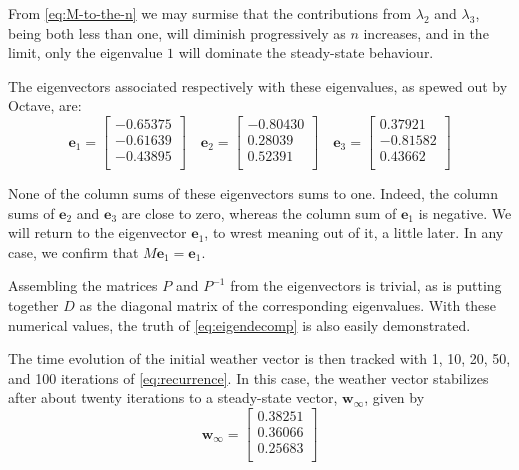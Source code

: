 \documentclass[
  11pt,
  a4paper,
]{article}
\begin{document}
From \cref{eq:M-to-the-n} we may surmise that the contributions from
\(\lambda_{2}\) and \(\lambda_{3}\), being both less than one, will
diminish progressively as \(n\) increases, and in the limit, only the
eigenvalue \(1\) will dominate the steady-state behaviour.

The eigenvectors associated respectively with these eigenvalues, as
spewed out by Octave, are: \[
\symbf{e}_{1} = \begin{bmatrix}
-0.65375\\
-0.61639\\
-0.43895\\
\end{bmatrix}
\quad
\symbf{e}_{2} = \begin{bmatrix}
-0.80430\\
0.28039\\
0.52391\\
\end{bmatrix}
\quad
\symbf{e}_{3} = \begin{bmatrix}
0.37921\\
-0.81582\\
0.43662\\
\end{bmatrix}
\]

None of the column sums of these eigenvectors sums to one. Indeed, the
column sums of \(\symbf{e}_{2}\) and \(\symbf{e}_{3}\) are close to
zero, whereas the column sum of \(\symbf{e}_{1}\) is negative. We will
return to the eigenvector \(\symbf{e}_{1}\), to wrest meaning out of it,
a little later. In any case, we confirm that
\(M\symbf{e}_{1} = \symbf{e}_{1}\).

Assembling the matrices \(P\) and \(P^{-1}\) from the eigenvectors is
trivial, as is putting together \(D\) as the diagonal matrix of the
corresponding eigenvalues. With these numerical values, the truth of
\cref{eq:eigendecomp} is also easily demonstrated.

The time evolution of the initial weather vector is then tracked with 1,
10, 20, 50, and 100 iterations of \cref{eq:recurrence}. In this case,
the weather vector stabilizes after about twenty iterations to a
steady-state vector, \(\symbf{w}_{\infty}\), given by \begin{equation}
\symbf{w}_{\infty} = \begin{bmatrix}
0.38251\\
0.36066\\
0.25683\\
\end{bmatrix}
\label{eq:steady-state}\end{equation}
\end{document}
